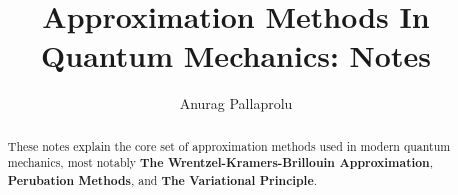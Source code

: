 \documentclass[12pt]{article}
\begin{document}
\title{Approximation Methods In Quantum Mechanics: Notes}
\author{Anurag Pallaprolu}
\maketitle
\begin{abstract}
These notes explain the core set of approximation methods used in modern quantum mechanics, most notably \textbf{The Wrentzel-Kramers-Brillouin Approximation}, \textbf{Perubation Methods}, and \textbf{The Variational Principle}.
\end{abstract}
\end{document}
